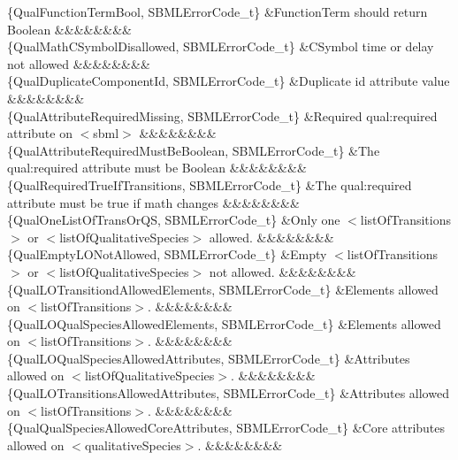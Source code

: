 \begin{DoxyParagraph}{}
\begin{longtabu}
\{Qual\+Function\+Term\+Bool, S\+B\+M\+L\+Error\+Code\+\_\+t\} &Function\+Term should return Boolean &&&&&&&&\\
\{Qual\+Math\+C\+Symbol\+Disallowed, S\+B\+M\+L\+Error\+Code\+\_\+t\} &C\+Symbol time or delay not allowed &&&&&&&&\\
\{Qual\+Duplicate\+Component\+Id, S\+B\+M\+L\+Error\+Code\+\_\+t\} &Duplicate \textquotesingle{}id\textquotesingle{} attribute value &&&&&&&&\\
\{Qual\+Attribute\+Required\+Missing, S\+B\+M\+L\+Error\+Code\+\_\+t\} &Required qual\+:required attribute on {\ttfamily $<$sbml$>$} &&&&&&&&\\
\{Qual\+Attribute\+Required\+Must\+Be\+Boolean, S\+B\+M\+L\+Error\+Code\+\_\+t\} &The qual\+:required attribute must be Boolean &&&&&&&&\\
\{Qual\+Required\+True\+If\+Transitions, S\+B\+M\+L\+Error\+Code\+\_\+t\} &The qual\+:required attribute must be \textquotesingle{}true\textquotesingle{} if math changes &&&&&&&&\\
\{Qual\+One\+List\+Of\+Trans\+Or\+QS, S\+B\+M\+L\+Error\+Code\+\_\+t\} &Only one {\ttfamily $<$list\+Of\+Transitions$>$} or {\ttfamily $<$list\+Of\+Qualitative\+Species$>$} allowed. &&&&&&&&\\
\{Qual\+Empty\+L\+O\+Not\+Allowed, S\+B\+M\+L\+Error\+Code\+\_\+t\} &Empty {\ttfamily $<$list\+Of\+Transitions$>$} or {\ttfamily $<$list\+Of\+Qualitative\+Species$>$} not allowed. &&&&&&&&\\
\{Qual\+L\+O\+Transitiond\+Allowed\+Elements, S\+B\+M\+L\+Error\+Code\+\_\+t\} &Elements allowed on {\ttfamily $<$list\+Of\+Transitions$>$}. &&&&&&&&\\
\{Qual\+L\+O\+Qual\+Species\+Allowed\+Elements, S\+B\+M\+L\+Error\+Code\+\_\+t\} &Elements allowed on {\ttfamily $<$list\+Of\+Transitions$>$}. &&&&&&&&\\
\{Qual\+L\+O\+Qual\+Species\+Allowed\+Attributes, S\+B\+M\+L\+Error\+Code\+\_\+t\} &Attributes allowed on {\ttfamily $<$list\+Of\+Qualitative\+Species$>$}. &&&&&&&&\\
\{Qual\+L\+O\+Transitions\+Allowed\+Attributes, S\+B\+M\+L\+Error\+Code\+\_\+t\} &Attributes allowed on {\ttfamily $<$list\+Of\+Transitions$>$}. &&&&&&&&\\
\{Qual\+Qual\+Species\+Allowed\+Core\+Attributes, S\+B\+M\+L\+Error\+Code\+\_\+t\} &Core attributes allowed on {\ttfamily $<$qualitative\+Species$>$}. &&&&&&&&\\

\end{longtabu}
\end{DoxyParagraph}
